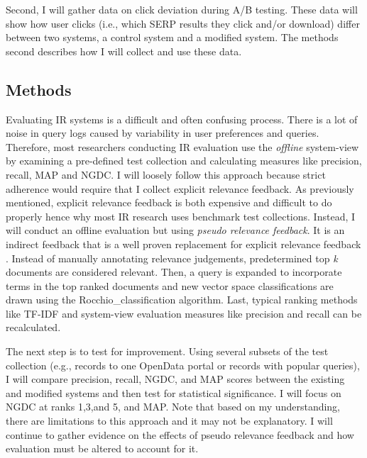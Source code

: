 Second, I will gather data on click deviation during A/B testing. These data will show how user clicks (i.e., which SERP results they click and/or download) differ between two systems, a control system and a modified system. The methods second describes how I will collect and use these data.

\subsection{Methods}
Evaluating IR systems is a difficult and often confusing process. There is a lot of noise in query logs caused by variability in user preferences and queries. Therefore, most researchers conducting IR evaluation use the \emph{offline} system-view by examining a pre-defined test collection and calculating measures like precision, recall, MAP and NGDC. I will loosely follow this approach because strict adherence would require that I collect explicit relevance feedback. As previously mentioned, explicit relevance feedback is both expensive and difficult to do properly hence why most IR research uses benchmark test collections. Instead, I will conduct an offline evaluation but using \emph{pseudo relevance feedback}. It is an indirect feedback that is a well proven replacement for explicit relevance feedback \cite{Manning2008}. Instead of manually annotating relevance judgements, predetermined top \emph{k} documents are considered relevant. Then, a query is expanded to incorporate terms in the top ranked documents and new vector space classifications are drawn using the \gls{Rocchio_classification} algorithm. Last, typical ranking methods like TF-IDF and system-view evaluation measures like precision and recall can be recalculated.

The next step is to test for improvement. Using several subsets of the test collection (e.g., records to one OpenData portal or records with popular queries), I will compare precision, recall, NGDC, and MAP scores between the existing and modified systems and then test for statistical significance. I will focus on NGDC at ranks 1,3,and 5, and MAP. Note that based on my understanding, there are limitations to this approach and it may not be explanatory. I will continue to gather evidence on the effects of pseudo relevance feedback and how evaluation must be altered to account for it.


